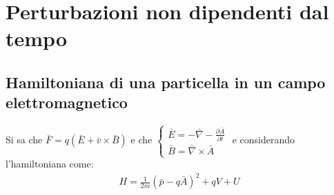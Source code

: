 \chapter{Perturbazioni non dipendenti dal tempo} %
\section{Hamiltoniana di una particella in un campo elettromagnetico} %
Si sa che $\bar F=q\left(\bar E+\bar v\times\bar B\right)$ e che $\begin{cases}
\bar E=-\bar \nabla -\frac{\partial \bar A}{\partial t} \\
\bar B=\bar \nabla \times\bar A 
\end{cases}
$ e considerando l'hamiltoniana come:
\begin{equation}\begin{split}
H=\frac{1}{2m}\left(\bar p-q\bar A\right)^2+qV+U
\end{split}\end{equation}

